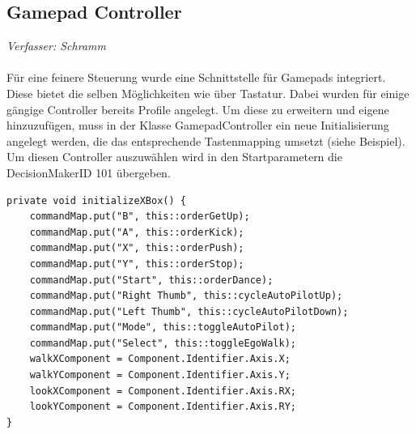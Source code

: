 \subsection{Gamepad Controller}
\textit{Verfasser: Schramm}\\
\\
Für eine feinere Steuerung wurde eine Schnittstelle für Gamepads integriert. Diese bietet die selben Möglichkeiten wie über Tastatur. Dabei wurden für einige gängige Controller bereits Profile angelegt. Um diese zu erweitern und eigene hinzuzufügen, muss in der Klasse GamepadController ein neue Initialisierung angelegt werden, die das entsprechende Tastenmapping umsetzt (siehe Beispiel).\\
Um diesen Controller auszuwählen wird in den Startparametern die DecisionMakerID 101 übergeben.

\begin{lstlisting}[caption=InitializeGamePad, captionpos=b, label=lst:Gamepad]
private void initializeXBox() {
    commandMap.put("B", this::orderGetUp);
    commandMap.put("A", this::orderKick);
    commandMap.put("X", this::orderPush);
    commandMap.put("Y", this::orderStop);
    commandMap.put("Start", this::orderDance);
    commandMap.put("Right Thumb", this::cycleAutoPilotUp);
    commandMap.put("Left Thumb", this::cycleAutoPilotDown);
    commandMap.put("Mode", this::toggleAutoPilot);
    commandMap.put("Select", this::toggleEgoWalk);
    walkXComponent = Component.Identifier.Axis.X;
    walkYComponent = Component.Identifier.Axis.Y;
    lookXComponent = Component.Identifier.Axis.RX;
    lookYComponent = Component.Identifier.Axis.RY;
}
\end{lstlisting}
